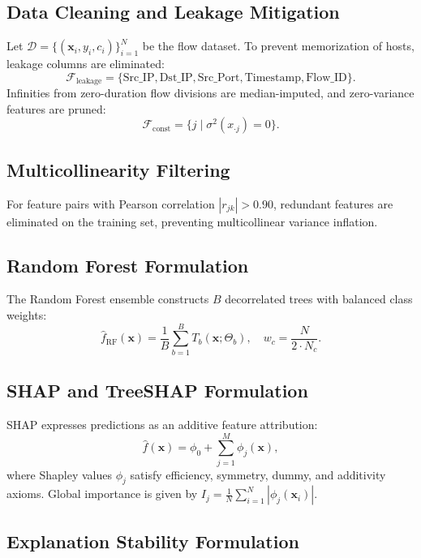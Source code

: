 \documentclass[conference]{IEEEtran}
\begin{document}
\subsection{Data Cleaning and Leakage Mitigation}
Let $\mathcal{D} = \{(\mathbf{x}_i, y_i, c_i)\}_{i=1}^{N}$ be the flow dataset. To prevent memorization of hosts, leakage columns are eliminated:
\begin{equation}
\mathcal{F}_{{\text{leakage}}} = \{\text{Src\_IP}, \text{Dst\_IP}, \text{Src\_Port}, \text{Timestamp}, \text{Flow\_ID}\}.
\end{equation}
Infinities from zero-duration flow divisions are median-imputed, and zero-variance features are pruned:
\begin{equation}
\mathcal{F}_{{\text{const}}} = \{j \mid \sigma^2(x_{\cdot j}) = 0\}.
\end{equation}

\subsection{Multicollinearity Filtering}
For feature pairs with Pearson correlation $|r_{jk}| > 0.90$, redundant features are eliminated on the training set, preventing multicollinear variance inflation.

\subsection{Random Forest Formulation}
The Random Forest ensemble constructs $B$ decorrelated trees with balanced class weights:
\begin{equation}
\hat{f}_{{\text{RF}}}(\mathbf{x}) = \frac{1}{B} \sum_{b=1}^B T_b(\mathbf{x}; \Theta_b), \quad w_c = \frac{N}{2 \cdot N_c}.
\end{equation}

\subsection{SHAP and TreeSHAP Formulation}
SHAP expresses predictions as an additive feature attribution:
\begin{equation}
\hat{f}(\mathbf{x}) = \phi_0 + \sum_{j=1}^M \phi_j(\mathbf{x}),
\end{equation}
where Shapley values $\phi_j$ satisfy efficiency, symmetry, dummy, and additivity axioms. Global importance is given by $I_j = \frac{1}{N} \sum_{i=1}^N |\phi_j(\mathbf{x}_i)|$.

\subsection{Explanation Stability Formulation}
\end{document}
